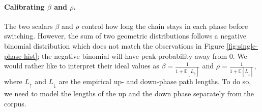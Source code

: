 \documentclass[sigconf, review]{acmart}
\begin{document}


\paragraph{Calibrating $\beta$ and $\rho$.}
\label{sec:beta-rho-calibration}

The two scalars $\beta$ and $\rho$ control how long the chain
stays in each phase before switching.  However, the sum of two geometric distributions follows a negative binomial distribution which does not match the observations in Figure \ref{fig:single-phase-hist}; the negative binomial will have peak probability away from $0$.  
We would rather like to interpret their ideal values as
$\beta = \frac{1}{1 + \mathbb{E}[L_{\uparrow}]}$ and
$\rho = \frac{1}{1 + \mathbb{E}[L_{\downarrow}]}$, where
$L_{\uparrow}$ and $L_{\downarrow}$ are the empirical up- and
down-phase path lengths.  To do so, we need to model the lengths of the up and the down phase separately from the corpus.  

\end{document}
